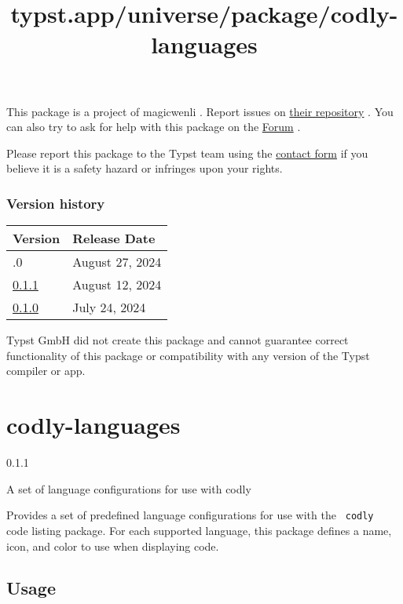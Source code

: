 This package is a project of magicwenli . Report issues on
\href{https://github.com/magicwenli/keyle}{their repository} . You can
also try to ask for help with this package on the
\href{https://forum.typst.app}{Forum} .

Please report this package to the Typst team using the
\href{https://typst.app/contact}{contact form} if you believe it is a
safety hazard or infringes upon your rights.

\label{versions}
\subsubsection{Version history}\label{version-history}

\begin{longtable}[]{@{}ll@{}}
\toprule\noalign{}
Version & Release Date \\
\midrule\noalign{}
\endhead
\bottomrule\noalign{}
\endlastfoot
0.2.0 & August 27, 2024 \\
\href{https://typst.app/universe/package/keyle/0.1.1/}{0.1.1} & August
12, 2024 \\
\href{https://typst.app/universe/package/keyle/0.1.0/}{0.1.0} & July 24,
2024 \\
\end{longtable}

Typst GmbH did not create this package and cannot guarantee correct
functionality of this package or compatibility with any version of the
Typst compiler or app.


\title{typst.app/universe/package/codly-languages}

\label{banner}
\section{codly-languages}\label{codly-languages}

{ 0.1.1 }

A set of language configurations for use with codly

\label{readme}
Provides a set of predefined language configurations for use with the
\texttt{\ codly\ } code listing package. For each supported language,
this package defines a name, icon, and color to use when displaying
code.

\subsection{Usage}\label{usage}


